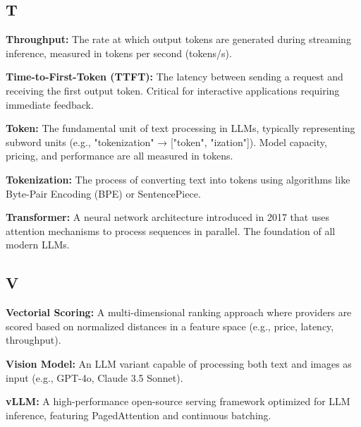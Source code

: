 \documentclass[english]{article}
\begin{document}
\subsection*{T}

\textbf{Throughput:} The rate at which output tokens are generated during streaming inference, measured in tokens per second (tokens/s).

\textbf{Time-to-First-Token (TTFT):} The latency between sending a request and receiving the first output token. Critical for interactive applications requiring immediate feedback.

\textbf{Token:} The fundamental unit of text processing in LLMs, typically representing subword units (e.g., "tokenization" → ["token", "ization"]). Model capacity, pricing, and performance are all measured in tokens.

\textbf{Tokenization:} The process of converting text into tokens using algorithms like Byte-Pair Encoding (BPE) or SentencePiece.

\textbf{Transformer:} A neural network architecture introduced in 2017 that uses attention mechanisms to process sequences in parallel. The foundation of all modern LLMs.

\subsection*{V}

\textbf{Vectorial Scoring:} A multi-dimensional ranking approach where providers are scored based on normalized distances in a feature space (e.g., price, latency, throughput).

\textbf{Vision Model:} An LLM variant capable of processing both text and images as input (e.g., GPT-4o, Claude 3.5 Sonnet).

\textbf{vLLM:} A high-performance open-source serving framework optimized for LLM inference, featuring PagedAttention and continuous batching.

\newpage

\printbibliography
\end{document}
